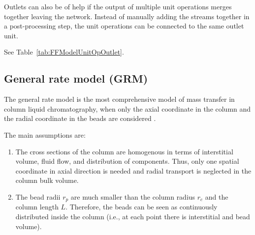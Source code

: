 Outlets can also be of help if the output of multiple unit operations merges together leaving the network.
Instead of manually adding the streams together in a post-processing step, the unit operations can be connected to the same outlet unit.

See Table~\ref{tab:FFModelUnitOpOutlet}.

\subsection{General rate model (GRM)}\label{sec:MUOPGRM}

The general rate model  is the most comprehensive model of mass transfer in column liquid chromatography, when only the axial coordinate in the column and the radial coordinate in the beads are considered \cite{Kucera1965,Gu1995,Guiochon2006,Felinger2004}.

The main assumptions are:
\begin{enumerate}
	\item The cross sections of the column are homogenous in terms of interstitial volume, fluid flow, and distribution of components. Thus, only one spatial coordinate in axial direction is needed and radial transport is neglected in the column bulk volume.
	\item The bead radii $r_{p}$ are much smaller than the column radius $r_c$ and the column length $L$. Therefore, the beads can be seen as continuously distributed inside the column (i.e., at each point there is interstitial and bead volume).
\end{enumerate}

